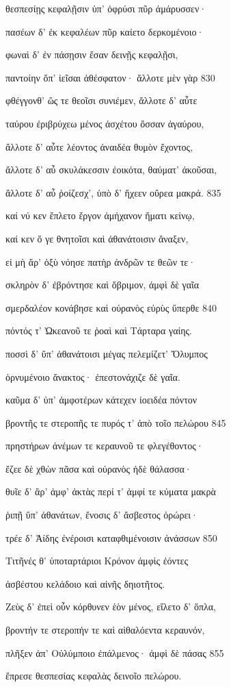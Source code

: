 θεσπεσίῃς κεφαλῇσιν ὑπ' ὀφρύσι πῦρ ἀμάρυσσεν· 

πασέων δ' ἐκ κεφαλέων πῦρ καίετο δερκομένοιο· 

φωναὶ δ' ἐν πάσῃσιν ἔσαν δεινῇς κεφαλῇσι,

παντοίην ὄπ' ἰεῖσαι ἀθέσφατον· ἄλλοτε μὲν γὰρ 830 

φθέγγονθ' ὥς τε θεοῖσι συνιέμεν, ἄλλοτε δ' αὖτε

ταύρου ἐριβρύχεω μένος ἀσχέτου ὄσσαν ἀγαύρου, 

ἄλλοτε δ' αὖτε λέοντος ἀναιδέα θυμὸν ἔχοντος,

ἄλλοτε δ' αὖ σκυλάκεσσιν ἐοικότα, θαύματ' ἀκοῦσαι,

ἄλλοτε δ' αὖ ῥοίζεσχ', ὑπὸ δ' ἤχεεν οὔρεα μακρά. 835

καί νύ κεν ἔπλετο ἔργον ἀμήχανον ἤματι κείνῳ,

καί κεν ὅ γε θνητοῖσι καὶ ἀθανάτοισιν ἄναξεν,

εἰ μὴ ἄρ' ὀξὺ νόησε πατὴρ ἀνδρῶν τε θεῶν τε· 

σκληρὸν δ' ἐβρόντησε καὶ ὄβριμον, ἀμφὶ δὲ γαῖα

σμερδαλέον κονάβησε καὶ οὐρανὸς εὐρὺς ὕπερθε 840

πόντός τ' Ὠκεανοῦ τε ῥοαὶ καὶ Τάρταρα γαίης. 

ποσσὶ δ' ὕπ' ἀθανάτοισι μέγας πελεμίζετ' Ὄλυμπος

ὀρνυμένοιο ἄνακτος· ἐπεστονάχιζε δὲ γαῖα.

καῦμα δ' ὑπ' ἀμφοτέρων κάτεχεν ἰοειδέα πόντον

βροντῆς τε στεροπῆς τε πυρός τ' ἀπὸ τοῖο πελώρου 845 

πρηστήρων ἀνέμων τε κεραυνοῦ τε φλεγέθοντος· 

ἔζεε δὲ χθὼν πᾶσα καὶ οὐρανὸς ἠδὲ θάλασσα· 

θυῖε δ' ἄρ' ἀμφ' ἀκτὰς περί τ' ἀμφί τε κύματα μακρὰ

ῥιπῇ ὕπ' ἀθανάτων, ἔνοσις δ' ἄσβεστος ὀρώρει· 

τρέε δ' Ἀίδης ἐνέροισι καταφθιμένοισιν ἀνάσσων 850

Τιτῆνές θ' ὑποταρτάριοι Κρόνον ἀμφὶς ἐόντες 

ἀσβέστου κελάδοιο καὶ αἰνῆς δηιοτῆτος. 

Ζεὺς δ' ἐπεὶ οὖν κόρθυνεν ἑὸν μένος, εἵλετο δ' ὅπλα,

βροντήν τε στεροπήν τε καὶ αἰθαλόεντα κεραυνόν,

πλῆξεν ἀπ' Οὐλύμποιο ἐπάλμενος· ἀμφὶ δὲ πάσας 855

ἔπρεσε θεσπεσίας κεφαλὰς δεινοῖο πελώρου.

